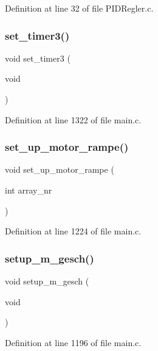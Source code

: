 Definition at line 32 of file P\+I\+D\+Regler.\+c.

\mbox{\label{main_8c_a87bff32642cb74c9350cc4676fda2b6e}} 
\subsubsection{set\+\_\+timer3()}
{\footnotesize\ttfamily void set\+\_\+timer3 (\begin{DoxyParamCaption}\item[{void}]{ }\end{DoxyParamCaption})}



Definition at line 1322 of file main.\+c.

\mbox{\label{main_8c_a9e44ea949ee3e5408d38f79758c8ea48}} 
\subsubsection{set\+\_\+up\+\_\+motor\+\_\+rampe()}
{\footnotesize\ttfamily void set\+\_\+up\+\_\+motor\+\_\+rampe (\begin{DoxyParamCaption}\item[{int}]{array\+\_\+nr }\end{DoxyParamCaption})}



Definition at line 1224 of file main.\+c.

\mbox{\label{main_8c_ac7688574b7282d8b949150e2aedf40cc}} 
\subsubsection{setup\+\_\+m\+\_\+gesch()}
{\footnotesize\ttfamily void setup\+\_\+m\+\_\+gesch (\begin{DoxyParamCaption}\item[{void}]{ }\end{DoxyParamCaption})}



Definition at line 1196 of file main.\+c.

\mbox{\label{main_8c_ac1a30b52ec4b2b781123c4ee519e526f}} 
